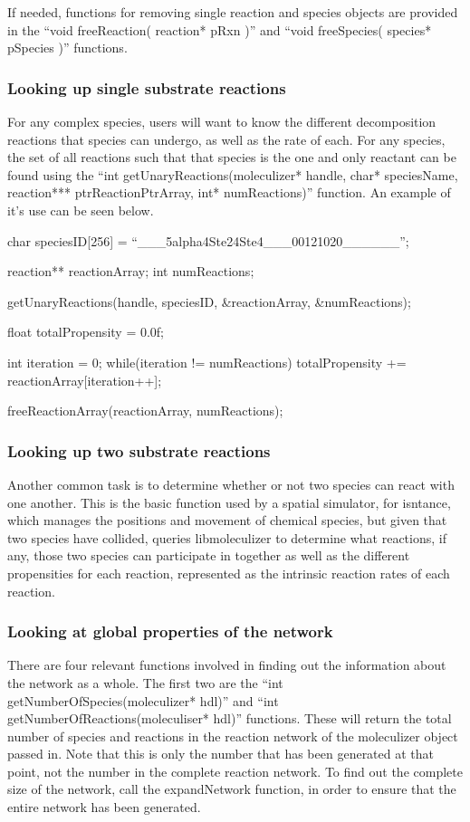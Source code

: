 If needed, functions for removing single reaction and species objects
are provided in the ``void freeReaction( reaction* pRxn )'' and ``void
freeSpecies( species* pSpecies )'' functions.  

\subsubsection{Looking up single substrate reactions}
For any complex species, users will want to know the different
decomposition reactions that species can undergo, as well as the
rate of each.  For any species, the set of all reactions such that
that species is the one and only reactant can be found using the ``int
getUnaryReactions(moleculizer* handle, char* speciesName, reaction***
ptrReactionPtrArray, int* numReactions)'' function.  An example of
it's use can be seen below.  

\begin{ExampleC}
  char speciesID[256] = ``___5alpha4Ste24Ste4___00121020______'';
  
  reaction** reactionArray;
  int numReactions;

  getUnaryReactions(handle, speciesID, &reactionArray, &numReactions);

  float totalPropensity = 0.0f;

  int iteration = 0;
  while(iteration != numReactions)
  {
    totalPropensity += reactionArray[iteration++];
  }

  freeReactionArray(reactionArray, numReactions);

\end{ExampleC}

\subsubsection{Looking up two substrate reactions}
Another common task is to determine whether or not two species can
react with one another.  This is the basic function used by a spatial
simulator, for isntance, which manages the positions and movement of
chemical species, but given that two species have collided, queries
libmoleculizer to determine what reactions, if any, those two species
can participate in together as well as the different propensities for
each reaction, represented as the intrinsic reaction rates of each
reaction.  

\subsubsection{Looking at global properties of the network}
There are four relevant functions involved in finding out the
information about the network as a whole.  The first two are the ``int
getNumberOfSpecies(moleculizer* hdl)'' and ``int
getNumberOfReactions(moleculiser* hdl)'' functions.  These will return
the total number of species and reactions in the reaction network of
the moleculizer object passed in.  Note that this is only the number
that has been generated at that point, not the number in the complete
reaction network.  To find out the complete size of the network, call
the expandNetwork function, in order to ensure that the entire network
has been generated.  

